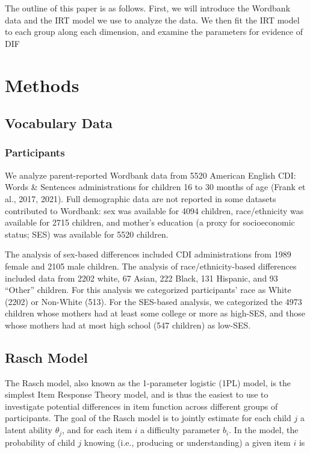 \documentclass[10pt, letterpaper]{article}
\begin{document}
The outline of this paper is as follows. First, we will introduce the
Wordbank data and the IRT model we use to analyze the data. We then fit
the IRT model to each group along each dimension, and examine the
parameters for evidence of DIF

\hypertarget{methods}{%
\section{Methods}\label{methods}}

\hypertarget{vocabulary-data}{%
\subsection{Vocabulary Data}\label{vocabulary-data}}

\hypertarget{participants}{%
\subsubsection{Participants}\label{participants}}

We analyze parent-reported Wordbank data from 5520 American English CDI:
Words \& Sentences administrations for children 16 to 30 months of age
(Frank et al., 2017, 2021). Full demographic data are not reported in
some datasets contributed to Wordbank: sex was available for 4094
children, race/ethnicity was available for 2715 children, and mother's
education (a proxy for socioeconomic status; SES) was available for 5520
children.

The analysis of sex-based differences included CDI administrations from
1989 female and 2105 male children. The analysis of race/ethnicity-based
differences included data from 2202 white, 67 Asian, 222 Black, 131
Hispanic, and 93 ``Other'' children. For this analysis we categorized
participants' race as White (2202) or Non-White (513). For the SES-based
analysis, we categorized the 4973 children whose mothers had at least
some college or more as high-SES, and those whose mothers had at most
high school (547 children) as low-SES.

\hypertarget{rasch-model}{%
\subsection{Rasch Model}\label{rasch-model}}

The Rasch model, also known as the 1-parameter logistic (1PL) model, is
the simplest Item Response Theory model, and is thus the easiest to use
to investigate potential differences in item function across different
groups of participants. The goal of the Rasch model is to jointly
estimate for each child \(j\) a latent ability \(\theta_j\), and for
each item \(i\) a difficulty parameter \(b_i\). In the model, the
probability of child \(j\) knowing (i.e., producing or understanding) a
given item \(i\) is
\end{document}
